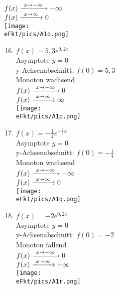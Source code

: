 \begin{Answer}[ref=eFktA1]
\begin{minipage}{\textwidth}
\begin{minipage}[t]{0.49\textwidth}
\begin{enumerate}[label=\alph*)]
				\(f(x)\xrightarrow{\hphantom{\ }x\to-\infty\hphantom{\ }}-\infty\)\\
				\(f(x)\xrightarrow{\hphantom{\ }x\to\infty\hphantom{\ }}0\)\\
				\texttt{[image: \\eFkt/pics/A1o.png]}
			\end{enumerate}
		\end{minipage}
		\begin{minipage}[t]{0.49\textwidth}
			\begin{enumerate}[label=\alph*)]
				\setcounter{enumi}{15}
				\item \(f(x)=5,3e^{0,2x}\)\\
				Asymptote \(y=0\)\\
				y-Achsenabschnitt: \(f(0)=5,3\)\\
				Monoton wachsend\\
				\(f(x)\xrightarrow{\hphantom{\ }x\to-\infty\hphantom{\ }}0\)\\
				\(f(x)\xrightarrow{\hphantom{\ }x\to\infty\hphantom{\ }}\infty\)\\
				\texttt{[image: \\eFkt/pics/A1p.png]}
				\item \(f(x)=-\frac{1}{4}e^{-\frac{2}{3}x}\)\\
				Asymptote \(y=0\)\\
				y-Achsenabschnitt: \(f(0)=-\frac{1}{4}\)\\
				Monoton wachsend\\
				\(f(x)\xrightarrow{\hphantom{\ }x\to-\infty\hphantom{\ }}-\infty\)\\
				\(f(x)\xrightarrow{\hphantom{\ }x\to\infty\hphantom{\ }}0\)\\
				\texttt{[image: \\eFkt/pics/A1q.png]}
				\item \(f(x)=-2e^{0,2x}\)\\
				Asymptote \(y=0\)\\
				y-Achsenabschnitt: \(f(0)=-2\)\\
				Monoton fallend\\
				\(f(x)\xrightarrow{\hphantom{\ }x\to-\infty\hphantom{\ }}0\)\\
				\(f(x)\xrightarrow{\hphantom{\ }x\to\infty\hphantom{\ }}-\infty\)\\
				\texttt{[image: \\eFkt/pics/A1r.png]}
			\end{enumerate}
		\end{minipage}
	\end{minipage}\\

\end{Answer}
